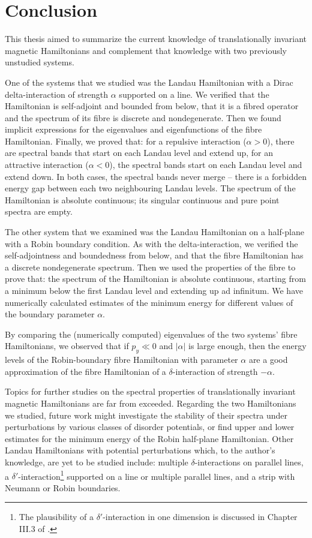 \chapter*{Conclusion}

This thesis aimed to summarize the current knowledge of translationally invariant magnetic Hamiltonians and complement that knowledge with two previously unstudied systems.

One of the systems that we studied was the Landau Hamiltonian with a Dirac delta-interaction of strength $\alpha$ supported on a line. We verified that the Hamiltonian is self-adjoint and bounded from below, that it is a fibred operator and the spectrum of its fibre is discrete and nondegenerate. Then we found implicit expressions for the eigenvalues and eigenfunctions of the fibre Hamiltonian. Finally, we proved that: for a repulsive interaction ($\alpha>0$), there are spectral bands that start on each Landau level and extend up, for an attractive interaction ($\alpha < 0$), the spectral bands start on each Landau level and extend down. In both cases, the spectral bands never merge – there is a forbidden energy gap between each two neighbouring Landau levels. The spectrum of the Hamiltonian is absolute continuous; its singular continuous and pure point spectra are empty.

The other system that we examined was the Landau Hamiltonian on a half-plane with a Robin boundary condition. As with the delta-interaction, we verified the self-adjointness and boundedness from below, and that the fibre Hamiltonian has a discrete nondegenerate spectrum. Then we used the properties of the fibre to prove that: the spectrum of the Hamiltonian is absolute continuous, starting from a minimum below the first Landau level and extending up ad infinitum. We have numerically calculated estimates of the minimum energy for different values of the boundary parameter $\alpha$.

By comparing the (numerically computed) eigenvalues of the two systems' fibre Hamiltonians, we observed that if $p_y \ll 0$ and $|\alpha|$ is large enough, then the energy levels of the Robin-boundary fibre Hamiltonian with parameter $\alpha$ are a good approximation of the fibre Hamiltonian of a $\delta$-interaction of strength $-\alpha$.

Topics for further studies on the spectral properties of translationally invariant magnetic Hamiltonians are far from exceeded. Regarding the two Hamiltonians we studied, future work might investigate the stability of their spectra under perturbations by various classes of disorder potentials, or find upper and lower estimates for the minimum energy of the Robin half-plane Hamiltonian. Other Landau Hamiltonians with potential perturbations which, to the author's knowledge, are yet to be studied include: multiple $\delta$-interactions on parallel lines, a $\delta'$-interaction\footnote{The plausibility of a $\delta'$-interaction in one dimension is discussed in Chapter III.3 of \cite{Albeverio2005}.} supported on a line or multiple parallel lines, and a strip with Neumann or Robin boundaries.
